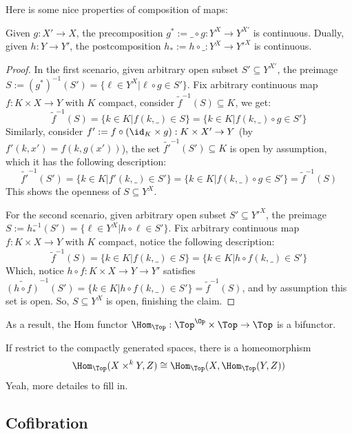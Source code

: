\documentclass{article}
\begin{document}
Here is some nice properties of composition of maps:
\begin{prop}
    Given $g:X'\rightarrow X$, the precomposition $g^*:=\_\circ g:Y^X\rightarrow Y^{X'}$ is continuous. Dually, given $h:Y\rightarrow Y'$, the postcomposition $h_*:=h\circ\_:Y^X\rightarrow Y'^X$ is continuous.
\end{prop}
\begin{proof}
    In the first scenario, given arbitrary open subset $S'\subseteq Y^{X'}$, the preimage $S:=(g^*)^{-1}(S') = \{\ell\in Y^X|\ell\circ g\in S'\}$. Fix arbitrary continuous map $f:K\times X\rightarrow Y$ with $K$ compact, consider $\tilde{f}^{-1}(S)\subseteq K$, we get:
    \[\tilde{f}^{-1}(S) = \{k\in K|f(k,\_)\in S\} = \{k\in K|f(k,\_)\circ g\in S'\}\]
    Similarly, consider $f' := f\circ (\id_K\times g):K\times X'\rightarrow Y$ (by $f'(k,x') = f(k,g(x'))$), the set $\tilde{f'}^{-1}(S')\subseteq K$ is open by assumption, which it has the following description:
    \[\tilde{f'}^{-1}(S')=\{k\in K|f'(k,\_)\in S'\} = \{k\in K|f(k,\_)\circ g\in S'\} = \tilde{f}^{-1}(S)\] 
    This shows the openness of $S\subseteq Y^X$.

    \hfil

    For the second scenario, given arbitrary open subset $S'\subseteq Y'^X$, the preimage $S:= h_*^{-1}(S') = \{\ell\in Y^X|h\circ \ell\in S'\}$. Fix arbitrary continuous map $f:K\times X\rightarrow Y$ with $K$ compact, notice the following description:
    \[\tilde{f}^{-1}(S) = \{k\in K|f(k,\_)\in S\} = \{k\in K|h\circ f(k,\_)\in S'\}\]
    Which, notice $h\circ f:K\times X\rightarrow Y\rightarrow Y'$ satisfies $\tilde{(h\circ f)}^{-1}(S') = \{k\in K|h\circ f(k,\_)\in S'\} = \tilde{f}^{-1}(S)$, and by assumption this set is open. So, $S\subseteq Y^X$ is open, finishing the claim.
\end{proof}

As a result, the Hom functor $\Hom_\Top:\Top^\Op \times \Top\rightarrow \Top$ is a bifunctor.

\hfil

If restrict to the compactly generated spaces, there is a homeomorphism \[\Hom_\Top (X\times^k Y, Z)\cong \Hom_\Top (X, \Hom_\Top (Y,Z))\]
Yeah, more detailes to fill in.

\subsection{Cofibration}
\end{document}
